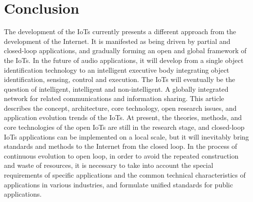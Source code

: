 \documentclass[a4paper,11pt]{article}
\begin{document}
\section{Conclusion}
The development of the IoTs currently presents a different approach from the development of the Internet. It is manifested as being driven by partial and closed-loop applications, and gradually forming an open and global framework of the IoTs. In the future of audio applications, it will develop from a single object identification technology to an intelligent executive body integrating object identification, sensing, control and execution. The IoTs will eventually be the question of intelligent, intelligent and non-intelligent. A globally integrated network for related communications and information sharing. This article describes the concept, architecture, core technology, open research issues, and application evolution trends of the IoTs. At present, the theories, methods, and core technologies of the open IoTs are still in the research stage, and closed-loop IoTs applications can be implemented on a local scale, but it will inevitably bring standards and methods to the Internet from the closed loop. In the process of continuous evolution to open loop, in order to avoid the repeated construction and waste of resources, it is necessary to take into account the special requirements of specific applications and the common technical characteristics of applications in various industries, and formulate unified standards for public applications.



\clearpage


\end{document}
